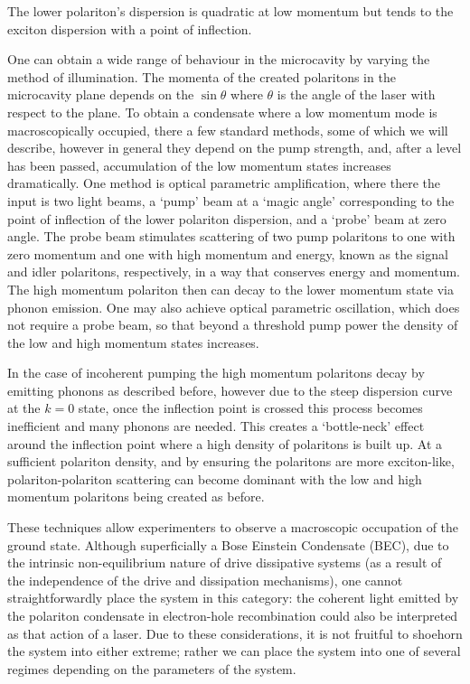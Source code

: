 \documentclass[letterpaper, 10 pt, conference]{IEEEtran}  %
\begin{document}
The lower polariton's dispersion is quadratic at low momentum but tends to the exciton dispersion with a point of inflection. 

One can obtain a wide range of behaviour in the microcavity by varying the method of illumination. 
The momenta of the created polaritons in the microcavity plane depends on the $\sin \theta$ where $\theta$ is the angle of the laser with respect to the plane. 
To obtain a condensate where a low momentum mode is macroscopically occupied, there a few standard methods, some of which we will describe, however in general they depend on the pump strength, and, after a level has been passed, accumulation of the low momentum states increases dramatically.
One method is optical parametric amplification, where there the input is two light beams, a `pump' beam at a `magic angle' corresponding to the point of inflection of the lower polariton dispersion, and a `probe' beam at zero angle. 
The probe beam stimulates scattering of two pump polaritons to one with zero momentum and one with high momentum and energy, known as the signal and idler polaritons, respectively, in a way that conserves energy and momentum. 
The high momentum polariton then can decay to the lower momentum state via phonon emission.
One may also achieve optical parametric oscillation, which does not require a probe beam, so that beyond a threshold pump power the density of the low and high momentum states increases.

In the case of incoherent pumping the high momentum polaritons decay by emitting phonons as described before, however due to the steep dispersion curve at the $k=0$ state, once the inflection point is crossed this process becomes inefficient and many phonons are needed. 
This creates a `bottle-neck' effect around the inflection point where a high density of polaritons is built up. 
At a sufficient polariton density, and by ensuring the polaritons are more exciton-like, polariton-polariton scattering can become dominant with the low and high momentum polaritons being created as before. 

These techniques allow experimenters to observe a macroscopic occupation of the ground state. 
Although superficially a Bose Einstein Condensate (BEC), due to the intrinsic non-equilibrium nature of drive dissipative systems (as a result of the independence of the drive and dissipation mechanisms), one cannot straightforwardly place the system in this category: the coherent light emitted by the polariton condensate in electron-hole recombination could also be interpreted as that action of a laser.  
Due to these considerations, it is not fruitful to shoehorn the system into either extreme; rather we can place the system into one of several regimes depending on the parameters of the system. 
\end{document}
